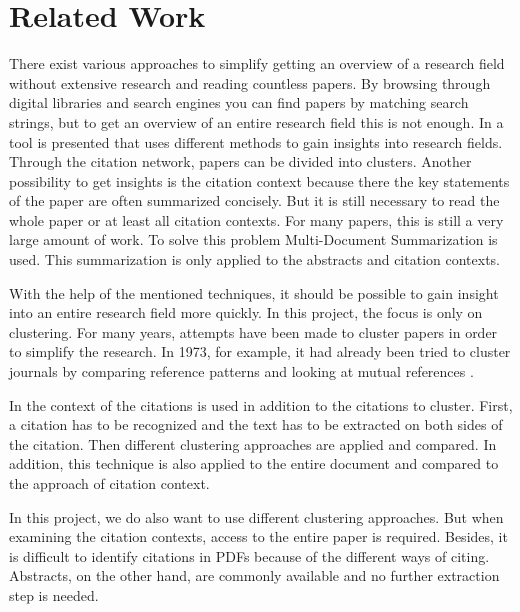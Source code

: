\section{Related Work}

There exist various approaches to simplify getting an overview of a research field without extensive research and reading countless papers. By browsing through digital libraries and search engines you can find papers by matching search strings, but to get an overview of an entire research field this is not enough.
In \cite{Rapid_understanding_of_scientific_paper_collections} a tool is presented that uses different methods to gain insights into research fields.
Through the citation network, papers can be divided into clusters.
Another possibility to get insights is the citation context because there the key statements of the paper are often summarized concisely.  But it is still necessary to read the whole paper or at least all citation contexts. For many papers, this is still a very large amount of work. To solve this problem Multi-Document Summarization is used. This summarization is only applied to the abstracts and citation contexts.
%

With the help of the mentioned techniques, it should be possible to gain insight into an entire research field more quickly.
In this project, the focus is only on clustering.
For many years, attempts have been made to cluster papers in order to simplify the research. In 1973, for example, it had already been tried to cluster journals by comparing reference patterns and looking at mutual references \cite{Clustering_of_scientific_journals}.

In \cite{Document_clustering_of_scientific_texts_using_citation_contexts} the context of the citations is used in addition to the citations to cluster.
First, a citation has to be recognized and the text has to be extracted on both sides of the citation. Then different clustering approaches are applied and compared. In addition, this technique is also applied to the entire document and compared to the approach of citation context.

In this project, we do also want to use different clustering approaches.
But when examining the citation contexts, access to the entire paper is required. Besides, it is difficult to identify citations in PDFs because of the different ways of citing. Abstracts, on the other hand, are commonly available and no further extraction step is needed.

